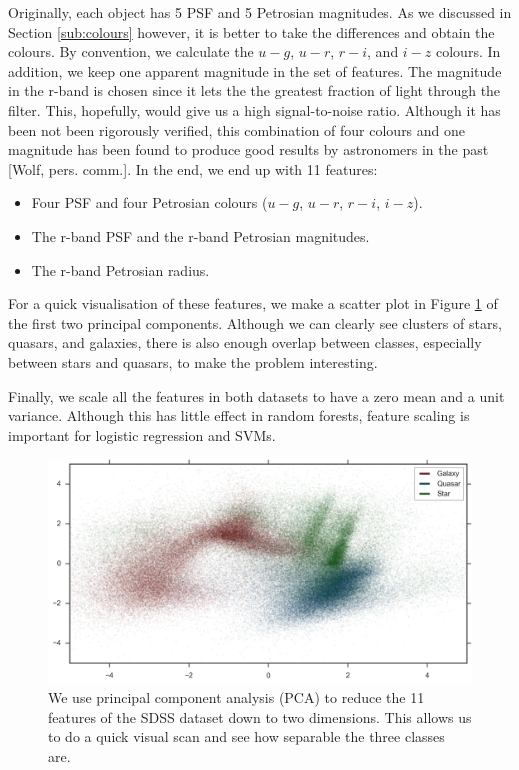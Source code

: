 Originally, each object has 5 PSF and 5 Petrosian magnitudes. As we discussed in Section
\ref{sub:colours} however, it is better to take the differences and obtain the colours. By
convention, we calculate the $u-g$, $u-r$, $r-i$, and $i-z$ colours. In addition, we keep one
apparent magnitude in the set of features. The magnitude in the r-band is chosen since it lets the
the greatest fraction of light through the filter. This, hopefully, would give us a high
signal-to-noise ratio. Although it has been not been rigorously verified, this combination of four
colours and one magnitude has been found to produce good results by astronomers in the past [Wolf,
pers. comm.]. In the end, we end up with 11 features:
\begin{itemize}
	\item Four PSF and four Petrosian colours ($u-g$, $u-r$, $r-i$, $i-z$).
    \item The r-band PSF and the r-band Petrosian magnitudes.
	\item The r-band Petrosian radius.
\end{itemize}
For a quick visualisation of these features, we make a scatter plot in Figure
\ref{fig:sdss_pca_all} of the first two principal components. Although we can clearly see clusters
of stars, quasars, and galaxies, there is also enough  overlap between classes, especially
between stars and quasars, to make the problem interesting.

Finally, we scale all the features in both datasets to have a zero mean and a unit variance.
Although this has little effect in random forests, feature scaling is important for logistic
regression and SVMs.

\begin{figure}[tbp]
	\centering
	\includegraphics[width=\textwidth]{figures/4_expt1/sdss_pca_all}
	\caption[First two principal components of the SDSS dataset]{We use principal
		component analysis (PCA) to reduce the 11 features of the SDSS dataset down
		to two dimensions. This allows us to do a quick visual scan and see how
		separable the three classes are.}
	\label{fig:sdss_pca_all}
\end{figure}


